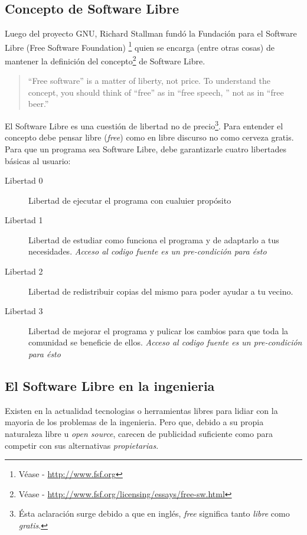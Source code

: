 \subsection{Concepto de Software Libre}
Luego del proyecto GNU, Richard Stallman fund\'o la Fundaci\'on para el 
Software Libre (Free Software Foundation)
\footnote{V\'ease - \url{http://www.fsf.org}} quien se encarga (entre otras
cosas) de
mantener la definici\'on del concepto\footnote{V\'ease -
\url{http://www.fsf.org/licensing/essays/free-sw.html}} de Software Libre.

\begin{quote}
``Free software'' is a matter of liberty, not price. 
To understand the concept, you should think of ``free'' as in ``free speech,
'' not as in ``free beer.''
\end{quote}

El Software Libre es una cuesti\'on de libertad no de precio\footnote{\'Esta
aclaraci\'on surge debido a que en ingl\'es, \emph{free} significa tanto
\emph{libre} como \emph{gratis}.}. Para entender el concepto debe pensar libre
(\emph{free}) como en libre discurso no como cerveza gratis.\\

Para que un programa sea Software Libre, debe garantizarle cuatro libertades
b\'asicas al usuario:

\begin{description}
\item[Libertad 0] Libertad de ejecutar el programa con cualuier prop\'osito
\item[Libertad 1] Libertad de estudiar como funciona el programa y de
adaptarlo
a tus necesidades. \emph{Acceso al codigo fuente es un pre-condici\'on para
\'esto}
\item[Libertad 2] Libertad de redistribuir copias del mismo para poder ayudar
a tu vecino.
\item[Libertad 3] Libertad de mejorar el programa y pulicar los cambios para
que toda la comunidad se beneficie de ellos. \emph{Acceso al codigo fuente es 
un pre-condici\'on para \'esto}
\end{description}


\subsection{El Software Libre en la ingenieria} 
Existen en la actualidad tecnologias o herramientas libres para lidiar con la
mayoria de los problemas de la ingenieria. Pero que, debido a su propia
naturaleza libre u \emph{open source}, carecen de publicidad suficiente como
para competir con sus alternativas \emph{propietarias}. \\

